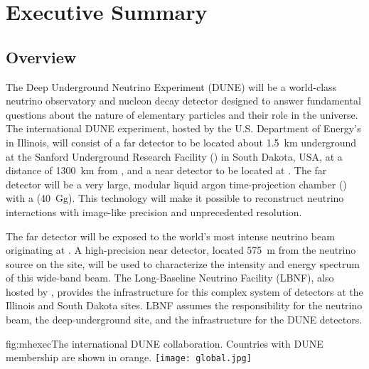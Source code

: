 \chapter{Executive Summary }
\label{ch:project-overview}
\section{Overview}

The Deep Underground Neutrino Experiment (DUNE) will be a world-class neutrino observatory and nucleon decay detector designed to answer fundamental questions about the nature of elementary particles and their role in the universe. The international DUNE experiment, hosted by the U.S. Department of Energy's \fnal in Illinois, will consist of a far detector to be located about \SI{1.5}{km} underground at the Sanford Underground Research Facility (\surf) in South Dakota, USA, at a distance of  \SI{1300}{\km} from \fnal{}, and a near detector to be located at \fnal. The far detector will be a very large, modular liquid argon time-projection chamber (\lartpc) with a \fdfiducialmass (\SI{40}{\giga\gram}). This \lar technology will make it possible to reconstruct neutrino interactions with image-like precision and unprecedented resolution. 

The far detector will be exposed to the world's most intense neutrino beam originating at \fnal{}. A high-precision near detector, located \SI{575}{m} from the neutrino source on the \fnal site, will be used to characterize the intensity and energy spectrum of this wide-band beam. The Long-Baseline Neutrino Facility (LBNF), also hosted by \fnal, provides the infrastructure for this complex system of detectors at the Illinois and South Dakota sites. LBNF assumes the responsibility for the neutrino beam, the deep-underground site, and the infrastructure for the DUNE detectors. 


\begin{dunefigure}{fig:mhexec}{The international DUNE
collaboration. Countries with DUNE membership are shown in orange.}
\texttt{[image: global.jpg]}
\label{fig:map}
\end{dunefigure}

